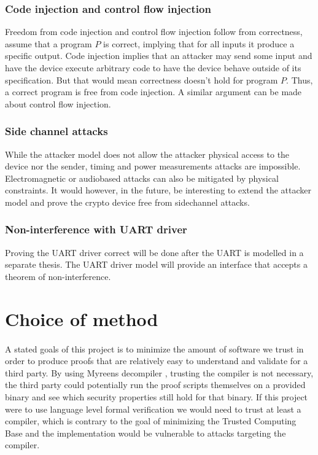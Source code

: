 \documentclass[fleqn]{kththesis}
\begin{document}
\subsubsection{Code injection and control flow injection}
Freedom from code injection and control flow injection follow from correctness, assume that a program $P$ is correct, implying that for all inputs it produce a specific output. Code injection implies that an attacker may send some input and have the device execute arbitrary code to have the device behave outside of its specification. But that would mean correctness doesn't hold for program $P$. Thus, a correct program is free from code injection. A similar argument can be made about control flow injection.

\subsubsection{Side channel attacks}
While the attacker model does not allow the attacker physical access to the device nor the sender, timing and power measurements attacks are impossible. Electromagnetic or audiobased attacks can also be mitigated by physical constraints. It would however, in the future, be interesting to extend the attacker model and prove the crypto device free from sidechannel attacks. 

\subsubsection{Non-interference with UART driver}
Proving the UART driver correct will be done after the UART is modelled in a separate thesis. The UART driver model will provide an interface that accepts a theorem of non-interference.

\section{Choice of method}
\paragraph{}
A stated goals of this project is to minimize the amount of software we trust in order to produce proofs that are relatively easy to understand and validate for a third party. By using Myreens decompiler \parencite{myreen_decompile}, trusting the compiler is not necessary, the third party could potentially run the proof scripts themselves on a provided binary and see which security properties still hold for that binary.  If this project were to use language level formal verification we would need to trust at least a compiler, which is contrary to the goal of minimizing the Trusted Computing Base and the implementation would be vulnerable to attacks targeting the compiler.
\end{document}
